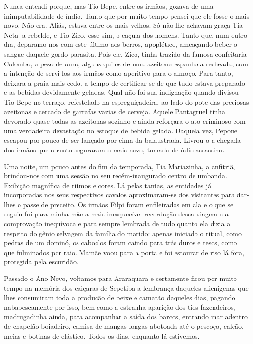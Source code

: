 Nunca entendi porque, mas Tio Bepe, entre os irmãos, gozava de uma inimputabilidade de índio.
Tanto que por muito tempo pensei que ele fosse o mais novo.
Não era.
Aliás, estava entre os mais velhos.
Só não lhe achavam graça Tia Neta, a rebelde, e Tio Zico, esse sim, o caçula dos homens.
Tanto que, num outro dia, deparamo-nos com este último aos berros, apoplético, ameaçando beber o sangue daquele gordo parasita.
Pois ele, Zico, tinha trazido da famosa confeitaria Colombo, a peso de ouro, alguns quilos de uma azeitona espanhola recheada, com a intenção de servi-los aos irmãos como aperitivo para o almoço.
Para tanto, deixara a praia mais cedo, a tempo de certificar-se de que tudo estava preparado e as bebidas devidamente geladas.
Qual não foi sua indignação quando divisou Tio Bepe no terraço, refestelado na espreguiçadeira, ao lado do pote das preciosas azeitonas e cercado de garrafas vazias de cerveja.
Aquele Pantagruel tinha devorado quase todas as azeitonas sozinho e ainda reforçara o ato criminoso com uma verdadeira devastação no estoque de bebida gelada.
Daquela vez, Pepone escapou por pouco de ser lançado por cima da balaustrada.
Livrou-o a chegada dos irmãos que a custo seguraram o mais novo, tomado de ódio assassino.

Uma noite, um pouco antes do fim da temporada, Tia Mariazinha, a anfitriã, brindou-nos com uma sessão no seu recém-inaugurado centro de umbanda.
Exibição magnífica de ritmos e cores.
Lá pelas tantas, as entidades já incorporadas nos seus respectivos cavalos aproximaram-se dos visitantes para dar-lhes o passe de preceito.
Os irmãos Filpi foram enfileirados em ala e o que se seguiu foi para minha mãe a mais inesquecível recordação dessa viagem e a comprovação inequívoca e para sempre lembrada de tudo quanto ela dizia a respeito do gênio selvagem da família do marido: apenas iniciado o ritual, como pedras de um dominó, os caboclos foram caindo para trás duros e tesos, como que fulminados por raio.
Mamãe voou para a porta e foi estourar de riso lá fora, protegida pela escuridão.

Passado o Ano Novo, voltamos para Araraquara e certamente ficou por muito tempo na memória dos caiçaras de Sepetiba a lembrança daqueles alienígenas que lhes consumiram toda a produção de peixe e camarão daqueles dias, pagando nababescamente por isso, bem como a estranha aparição dos tios fazendeiros, madrugadinha ainda, para acompanhar a saída dos barcos, entrando mar adentro de chapelão boiadeiro, camisa de mangas longas abotoada até o pescoço, calção, meias e botinas de elástico.
Todos os dias, enquanto lá estivemos.

